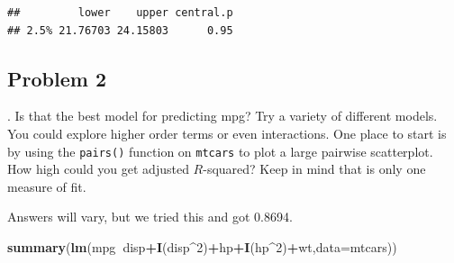 \documentclass[
]{book}
\newenvironment{Shaded}{\begin{snugshade}}{\end{snugshade}}
\newcommand{\DataTypeTok}[1]{\textcolor[rgb]{0.13,0.29,0.53}{#1}}
\newcommand{\DecValTok}[1]{\textcolor[rgb]{0.00,0.00,0.81}{#1}}
\newcommand{\FloatTok}[1]{\textcolor[rgb]{0.00,0.00,0.81}{#1}}
\newcommand{\KeywordTok}[1]{\textcolor[rgb]{0.13,0.29,0.53}{\textbf{#1}}}
\newcommand{\NormalTok}[1]{#1}
\newcommand{\OperatorTok}[1]{\textcolor[rgb]{0.81,0.36,0.00}{\textbf{#1}}}
\begin{document}
\begin{Shaded}
\end{Shaded}

\begin{verbatim}
##         lower    upper central.p
## 2.5% 21.76703 24.15803      0.95
\end{verbatim}

\hypertarget{problem-2-27}{%
\subsection{Problem 2}\label{problem-2-27}}

. Is that the best model for predicting mpg? Try a variety of different models. You could explore higher order terms or even interactions. One place to start is by using the \texttt{pairs()} function on \texttt{mtcars} to plot a large pairwise scatterplot. How high could you get adjusted \(R\)-squared? Keep in mind that is only one measure of fit.

Answers will vary, but we tried this and got 0.8694.

\begin{Shaded}
\begin{Highlighting}[]
\KeywordTok{summary}\NormalTok{(}\KeywordTok{lm}\NormalTok{(mpg}\OperatorTok{~}\NormalTok{disp}\OperatorTok{+}\KeywordTok{I}\NormalTok{(disp}\OperatorTok{^}\DecValTok{2}\NormalTok{)}\OperatorTok{+}\NormalTok{hp}\OperatorTok{+}\KeywordTok{I}\NormalTok{(hp}\OperatorTok{^}\DecValTok{2}\NormalTok{)}\OperatorTok{+}\NormalTok{wt,}\DataTypeTok{data=}\NormalTok{mtcars))}
\end{Highlighting}
\end{Shaded}
\end{document}
